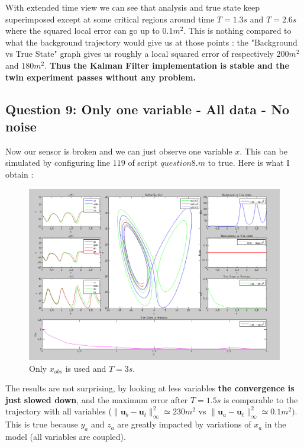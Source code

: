 \documentclass[11pt,a4paper]{article}
\renewcommand{\norm}[1]{\lVert #1 \rVert}
\renewcommand{\u} {\mathbf{u}}
\begin{document}
With extended time view we can see that analysis and true state keep superimposed except at some critical regions around time $T = 1.3s$ and $T = 2.6s$ where the squared local error can go up to $0.1m^2$. This is nothing compared to what the background trajectory would give us at those points :  the "Background vs True State" graph gives us roughly a local squared error of respectively $200m^2$ and $180m^2$. \textbf{Thus the Kalman Filter implementation is stable and the twin experiment passes without any problem.}

\clearpage
\subsection{Question 9: Only one variable - All data - No noise}

\vskip 0.5cm

Now our sensor is broken and we can just observe one variable $x$. This can be simulated by configuring line $119$ of script $question8.m$ to true.
Here is what I obtain :

\vskip 0.5cm

\begin{figure}[H]
   \includegraphics[width=16cm]{Q9.png}
   \caption{Only $x_{obs}$ is used and $T = 3s$.}
\end{figure}

\vskip 0.5cm

The results are not surprising, by looking at less variables \textbf{the convergence is just slowed down}, and the maximum error after $T=1.5s$ is comparable to the trajectory with all variables ($\norm{\u_b - \u_t}_{\infty}^2 \simeq 230 m^2$ vs $\norm{\u_a - \u_t}_{\infty}^2 \simeq 0.1 m^2)$. This is true because $y_a$ and $z_a$ are greatly impacted by variations of $x_a$ in the model (all variables are coupled). 
\end{document}
